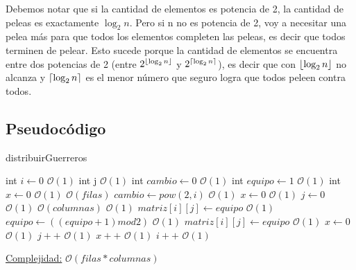 \documentclass[10pt,a4paper]{article}
\DeclarePairedDelimiter\ceil{\lceil}{\rceil}
\DeclarePairedDelimiter\floor{\lfloor}{\rfloor}
\begin{document}
\par{Debemos notar que si la cantidad de elementos es potencia de 2, la cantidad de peleas es exactamente $\log_2 n$. Pero si n no es potencia de 2, voy a necesitar una pelea más para que todos los elementos completen las peleas, es decir que todos terminen de pelear. Esto sucede porque la cantidad de elementos se encuentra entre dos
potencias de 2 (entre $2^{\floor*{\log_2 n}}$ y $2^{\ceil*{\log_2 n}}$), es decir que con ${\floor*{\log_2 n}}$ no alcanza y ${\ceil*{\log_2 n}}$ es el menor número que seguro logra que todos peleen contra todos.}


\subsection{Pseudocódigo}

\begin{algorithm}
\caption{distribuirGuerreros}
\begin{algorithmic}
	\State int $i \gets 0$ \Comment $\mathcal{O}(1)$
	\State int j \Comment $\mathcal{O}(1)$
	\State int $cambio \gets 0$ \Comment $\mathcal{O}(1)$
	\State int $equipo \gets 1$ \Comment $\mathcal{O}(1)$
	\State int $x \gets 0$ \Comment $\mathcal{O}(1)$
	 \Comment $\mathcal{O}(filas)$
		\State $cambio \gets pow(2,i)$ \Comment $\mathcal{O}(1)$
		\State $x \gets 0$ \Comment $\mathcal{O}(1)$
		\State $j \gets 0$ \Comment $\mathcal{O}(1)$
		 \Comment $\mathcal{O}(columnas)$
			 \Comment $\mathcal{O}(1)$
				\State $matriz[i][j] \gets equipo$ \Comment $\mathcal{O}(1)$
			\Else
				\State $equipo \gets ((equipo +1) mod 2)$ \Comment $\mathcal{O}(1)$
				\State $matriz[i][j] \gets equipo$ \Comment $\mathcal{O}(1)$
				\State $x \gets 0$ \Comment $\mathcal{O}(1)$
			\EndIf
			\State $j++$ \Comment $\mathcal{O}(1)$
			\State $x++$ \Comment $\mathcal{O}(1)$
		\EndWhile
		\State $i++$ \Comment $\mathcal{O}(1)$
	\EndWhile
\EndFunction
\end{algorithmic}
\underline{Complejidad:} $\mathcal{O}(filas*columnas)$\\
\end{algorithm}
\end{document}
